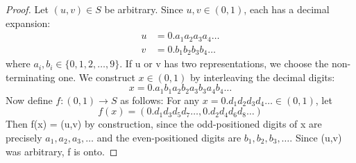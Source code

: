 \documentclass[12pt]{article}
\newcommand{\eps}{\ensuremath{\epsilon}}
\begin{document}
\begin{proof}
Let $(u,v) \in S$ be arbitrary. Since $u,v \in (0,1)$, each has a decimal expansion:
\begin{align*}
  u &= 0.a_1a_2a_3a_4\dots \\
  v &= 0.b_1b_2b_3b_4\dots
\end{align*}
where $a_i, b_i \in \{0,1,2,\dots,9\}$. If u or v has two representations, we choose the non-terminating one.\newline
We construct $x \in (0,1)$ by interleaving the decimal digits:
$$x = 0.a_1b_1a_2b_2a_3b_3a_4b_4\dots$$
Now define $f: (0,1) \to S$ as follows: For any $x = 0.d_1d_2d_3d_4\dots \in (0,1)$, let
$$f(x) = (0.d_1d_3d_5d_7\dots, 0.d_2d_4d_6d_8\dots)$$
Then f(x) = (u,v) by construction, since the odd-positioned digits of x are precisely $a_1,a_2,a_3,\dots$ and the even-positioned digits are $b_1,b_2,b_3,\dots$.
Since (u,v) was arbitrary, f is onto.
\end{proof}


\end{document}
